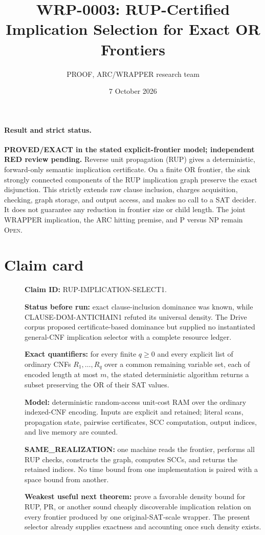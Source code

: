 \documentclass[11pt]{article}
\title{WRP-0003: RUP-Certified Implication Selection for Exact OR Frontiers}
\author{PROOF, ARC/WRAPPER research team}
\date{7 October 2026}
\begin{document}
\maketitle

\paragraph{Result and strict status.}
\textbf{PROVED/EXACT in the stated explicit-frontier model; independent RED
review pending.}  Reverse unit propagation (RUP) gives a deterministic,
forward-only semantic implication certificate.  On a finite OR frontier, the
sink strongly connected components of the RUP implication graph preserve the
exact disjunction.  This strictly extends raw clause inclusion, charges
acquisition, checking, graph storage, and output access, and makes no call to
a SAT decider.  It does not guarantee any reduction in frontier size or child
length.  The joint WRAPPER implication, the ARC hitting premise, and P versus
NP remain \textsc{Open}.

\section*{Claim card}
\begin{description}
\item[] \textbf{Claim ID:} RUP-IMPLICATION-SELECT1.
\item[] \textbf{Status before run:} exact clause-inclusion dominance was
known, while CLAUSE-DOM-ANTICHAIN1 refuted its universal density.  The Drive
corpus proposed certificate-based dominance but supplied no instantiated
general-CNF implication selector with a complete resource ledger.
\item[] \textbf{Exact quantifiers:} for every finite $q\geq 0$ and every
explicit list of ordinary CNFs $R_1,\ldots,R_q$ over a common remaining
variable set, each of encoded length at most $m$, the stated deterministic
algorithm returns a subset preserving the OR of their SAT values.
\item[] \textbf{Model:} deterministic random-access unit-cost RAM over the
ordinary indexed-CNF encoding.  Inputs are explicit and retained; literal
scans, propagation state, pairwise certificates, SCC computation, output
indices, and live memory are counted.
\item[] \textbf{SAME\_REALIZATION:} one machine reads the frontier, performs
all RUP checks, constructs the graph, computes SCCs, and returns the retained
indices.  No time bound from one implementation is paired with a space bound
from another.
\item[] \textbf{Weakest useful next theorem:} prove a favorable density
bound for RUP, PR, or another sound cheaply discoverable implication relation
on every frontier produced by one original-SAT-scale wrapper.  The present
selector already supplies exactness and accounting once such density exists.
\end{description}
\end{document}
